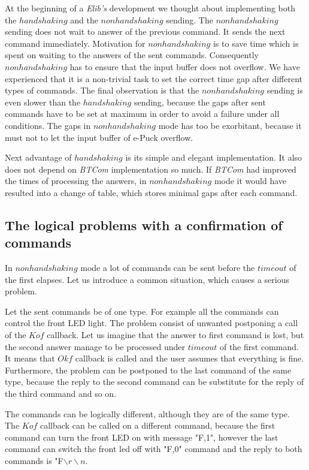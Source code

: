   At the beginning of a {\it Elib's} development we thought about implementing both the $handshaking$
  and the $nonhandshaking$ sending.
  The $nonhandshaking$ sending does not wait to answer of the previous command. It sends the next command immediately. 
  Motivation for $nonhandshaking$ is to save time which is spent on waiting to the answers of the sent commands.
  Consequently $nonhandshaking$ has to ensure that the input buffer does not overflow.
  We have experienced that it is a non-trivial task to set the correct time gap after different types of commands. 
  The final observation is that the $nonhandshaking$ sending is even slower than the $handshaking$ sending, 
  because the gaps after sent commands have to be set at maximum in order to avoid a failure under all conditions. 
  The gaps in $nonhandshaking$ mode has too be exorbitant, %
  because it must not to let the input buffer of e-Puck overflow.

  Next advantage of $handshaking$ is its simple and elegant implementation. It also does not depend on {\it BTCom} implementation so much.
  If {\it BTCom} had improved the times of processing the answers,
  in $nonhandshaking$ mode it would have resulted into a change of table, which stores minimal gaps after each command.



  \subsection{The logical problems with a confirmation of commands}\label{sec:logical}
  In $nonhandshaking$ mode a lot of commands can be sent before the $timeout$ of the first elapses.
  Let us introduce a common situation, which causes a serious problem. 
  
  Let the sent commands be of one type. For example all the commands can control the front LED light.	
  The problem consist of unwanted postponing a call of the $Kof$ callback. 
  Let us imagine that the answer to first command
  is lost, but the second answer manage to be processed under $timeout$ of the first command.
  It means that $Okf$ callback is called and the user assumes that everything is fine.
  Furthermore, the problem can be postponed to the last command of the same type,
  because the reply to the second command can be substitute for the reply of the third command
  and so on.

  The commands can be logically different, although they are of the same type.
  The $Kof$ callback can be called on a different command, because the first command can turn the front LED on 
  with message "F,1", however the last command can switch the front led off with "F,0" command and 
  the reply to both commands is "F$\backslash r\backslash n$.


